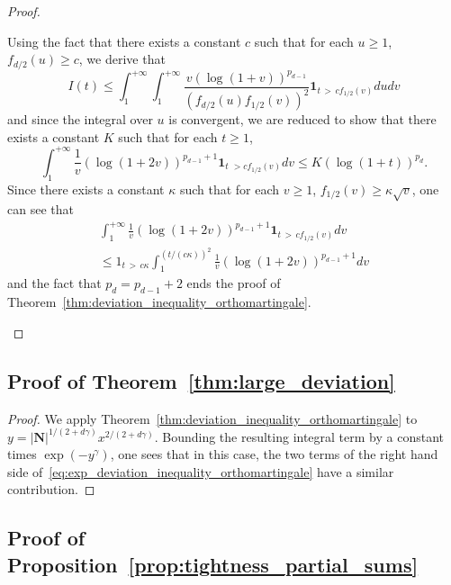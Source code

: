 \documentclass[10pt]{amsart}
\theoremstyle{definition}\newtheorem{defi}[theo]{Definition}\newtheorem{rema}[theo]{Remark}\newtheorem{exam}[theo]{Example}\newtheorem{exem}[theo]{Example}\newtheorem{nota}[theo]{Notation}
\newcommand{\bfun}{\mathbf{1}}
\newcommand\abs[1]{|#1|}
\newcommand{\pr}[1]{(#1)}
\newcommand{\gr}[1]{\bm{#1}}
\begin{document}
\begin{proof}
\begin{itemize}
Using the fact that there exists a constant $c$ such that for each $u\geq 1$, $f_{d/2}\pr{u}\geq c$, we derive that
\begin{equation}
I\pr{t}\leq \int_1^{+\infty}\int_1^{+\infty}\frac{v\left(\log\pr{1+v}\right)^{p_{d-1}} }{\left(f_{d/2}\pr{u}f_{1/2}\pr{v}\right)^2}
\bfun_{t\,>\,cf_{1/2}\pr{v} }du dv
\end{equation}
and since the integral over $u$ is convergent, we are reduced to show that there exists a constant $K$ such that for each $t\geq 1$,
\begin{equation}
\int_1^{+\infty}\frac1v\left(\log\pr{1+2v}\right)^{p_{d-1}+1}\bfun_{t\,\,>cf_{1/2}
\pr{v}}dv \leq K\left(\log\pr{1+t} \right)^{p_d}.
\end{equation}
Since there exists a constant $\kappa$ such that for each $v\geq 1$, $f_{1/2}\pr{v}\geq \kappa\sqrt v$, one can see that
\begin{multline}
\int_1^{+\infty}\frac1v\left(\log\pr{1+2v}\right)^{p_{d-1}+1}\bfun_{t\,>\,cf_{1/2}\pr{v} }dv \\
\leq 1_{t\,>\,c\kappa}\int_1^{\pr{t/(c\kappa)}^2}
\frac1v\left(\log\pr{1+2v}\right)^{p_{d-1}+1}dv
\end{multline}
and the fact that $p_d=p_{d-1}+2$ ends the proof of Theorem~\ref{thm:deviation_inequality_orthomartingale}.\qedhere
\end{itemize}
\end{proof}

\subsection{Proof of Theorem~\ref{thm:large_deviation}}
\begin{proof}
We apply Theorem~\ref{thm:deviation_inequality_orthomartingale} to $y=\abs{\gr{N}}^{1/\pr{2+d\gamma}}x^{2/\pr{2+d\gamma}}$. Bounding the resulting integral term by a constant times $\exp\pr{-y^\gamma}$, one sees that in this case, the two terms of the right hand side of~\eqref{eq:exp_deviation_inequality_orthomartingale} have a similar contribution.
\end{proof}

\subsection{Proof of Proposition~\ref{prop:tightness_partial_sums}}
\end{document}
